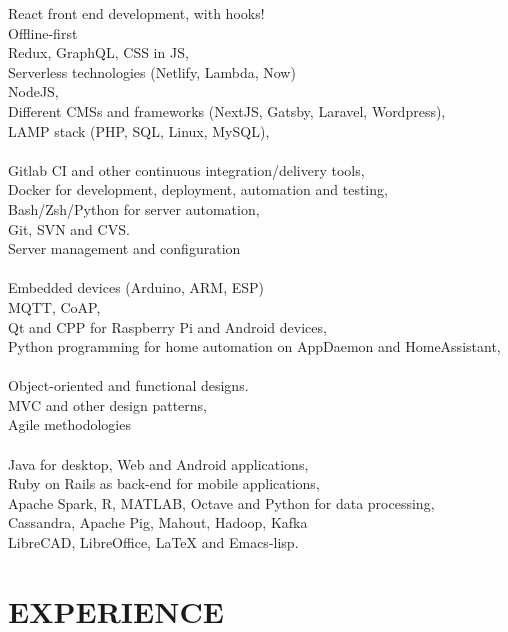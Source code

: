 \documentclass[margin, 10pt]{res} %
\begin{document}
\begin{resume}
React front end development, with hooks! \\
Offline-first \\
Redux, GraphQL, CSS in JS, \\
Serverless technologies (Netlify, Lambda, Now) \\
NodeJS, \\
Different CMSs and frameworks (NextJS, Gatsby, Laravel, Wordpress), \\
LAMP stack (PHP, SQL, Linux, MySQL), \\
\\
Gitlab CI and other continuous integration/delivery tools, \\
Docker for development, deployment, automation and testing, \\
Bash/Zsh/Python for server automation, \\
Git, SVN and CVS. \\
Server management and configuration \\
\\
Embedded devices (Arduino, ARM, ESP) \\
MQTT, CoAP, \\
Qt and CPP for Raspberry Pi and Android devices, \\
Python programming for home automation on AppDaemon and HomeAssistant, \\
\\
Object-oriented and functional designs. \\
MVC and other design patterns, \\
Agile methodologies \\
\\
Java for desktop, Web and Android applications, \\
Ruby on Rails as back-end for mobile applications, \\
Apache Spark, R, MATLAB, Octave and Python for data processing, \\
Cassandra, Apache Pig, Mahout, Hadoop, Kafka \\
LibreCAD, LibreOffice, LaTeX and Emacs-lisp. \\
 
 
\section{EXPERIENCE}


\end{resume}
\end{document}
